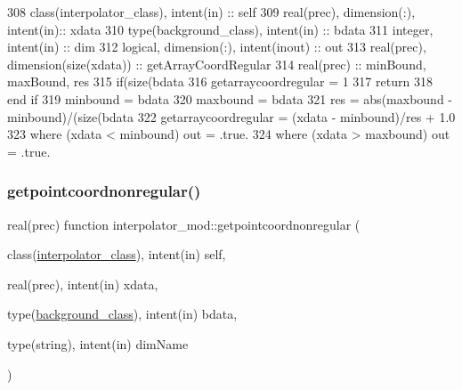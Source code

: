 \begin{DoxyCode}
308     \textcolor{keywordtype}{class}(interpolator\_class), \textcolor{keywordtype}{intent(in)} :: self
309     \textcolor{keywordtype}{real(prec)}, \textcolor{keywordtype}{dimension(:)}, \textcolor{keywordtype}{intent(in)}:: xdata
310     \textcolor{keywordtype}{type}(background\_class), \textcolor{keywordtype}{intent(in)} :: bdata
311     \textcolor{keywordtype}{integer}, \textcolor{keywordtype}{intent(in)} :: dim
312     \textcolor{keywordtype}{logical}, \textcolor{keywordtype}{dimension(:)}, \textcolor{keywordtype}{intent(inout)} :: out
313     \textcolor{keywordtype}{real(prec)}, \textcolor{keywordtype}{dimension(size(xdata))} :: getArrayCoordRegular
314     \textcolor{keywordtype}{real(prec)} :: minBound, maxBound, res
315     \textcolor{keywordflow}{if}(\textcolor{keyword}{size}(bdata%
316         getarraycoordregular = 1
317         \textcolor{keywordflow}{return}
318 \textcolor{keywordflow}{    end if}
319     minbound = bdata%
320     maxbound = bdata%
321     res = abs(maxbound - minbound)/(\textcolor{keyword}{size}(bdata%
322     getarraycoordregular = (xdata - minbound)/res + 1.0
323     \textcolor{keywordflow}{where} (xdata < minbound) out = .true.
324     \textcolor{keywordflow}{where} (xdata > maxbound) out = .true.
\end{DoxyCode}
\mbox{\label{namespaceinterpolator__mod_a42030e713960b5bf88d00a76a7ed0a72}} 
\subsubsection{\texorpdfstring{getpointcoordnonregular()}{getpointcoordnonregular()}}
{\footnotesize\ttfamily real(prec) function interpolator\+\_\+mod\+::getpointcoordnonregular (\begin{DoxyParamCaption}\item[{class(\mbox{\hyperlink{structinterpolator__mod_1_1interpolator__class}{interpolator\+\_\+class}}), intent(in)}]{self,  }\item[{real(prec), intent(in)}]{xdata,  }\item[{type(\mbox{\hyperlink{structbackground__mod_1_1background__class}{background\+\_\+class}}), intent(in)}]{bdata,  }\item[{type(string), intent(in)}]{dim\+Name }\end{DoxyParamCaption})\hspace{0.3cm}{\ttfamily [private]}}



